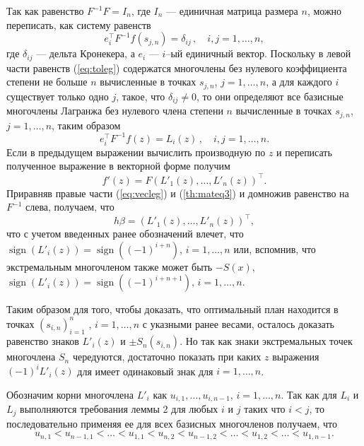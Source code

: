 \documentclass[specialist,
               substylefile = spbu.rtx,
               subf,href,colorlinks=true, 12pt]{disser}
\theoremstyle{definition}
\DeclareMathOperator*{\sign}{sign}
\begin{document}
	Так как равенство $F^{-1}F = I_n$, где $I_n$ --- единичная матрица размера $n$, можно переписать, как систему равенств
	\begin{equation}
		\label{eq:toleg}
		e_i^{\top} F^{-1} f(s_{j,n}) = \delta_{ij} \, , \quad i, j = 1, \ldots , n ,
	\end{equation}
	где $\delta_{ij}$ --- дельта Кронекера, а $e_i$ --- $i$--ый единичный вектор. Поскольку в левой части равенств (\ref{eq:toleg}) содержатся многочлены без нулевого коэффициента степени не больше $n$ вычисленные в точках $s_{j, n}$, $j=1, \ldots , n$, а для каждого $i$ существует только одно $j$, такое, что $\delta_{ij} \neq 0$, то они определяют все базисные многочлены Лагранжа без нулевого члена степени $n$ вычисленные в точках $s_{j, n}$, $j=1, \ldots , n$, таким образом
	\begin{equation}
		\label{eq:leg}
		e_i^{\top} F^{-1} f(z) = L_i(z) \, , \quad i, j = 1, \ldots , n .
	\end{equation}
	Если в предыдущем выражении вычислить производную по $z$ и переписать полученное выражение в векторной форме получим
	\begin{equation}
		\label{eq:vecleg}
		f'(z) = F \left( L'_1(z), \ldots, L'_n(z) \right)^\top.
	\end{equation}
	Приравняв правые части (\ref{eq:vecleg}) и (\ref{th:mateq3}) и домножив равенство на $F^{-1}$ слева, получаем, что
	\begin{equation}
		\label{eq:vecleg}
		h \beta = \left( L'_1(z), \ldots, L'_n(z) \right)^\top,
	\end{equation}
	что с учетом введенных ранее обозначений влечет, что $\sign (L'_i(z)) = \sign((-1)^{i+n}) $, $i = 1, \ldots, n$ или, вспомнив, что экстремальным многочленом также может быть $-S(x)$,  $\sign (L'_i(z)) = \sign((-1)^{i+n+1}) $, $i = 1, \ldots, n$.
	
	Таким образом для того, чтобы доказать, что оптимальный план находится в точках $(s_{i, n})_{i=1}^n$ , $i = 1, \ldots, n$ с указными ранее весами, осталось доказать равенство знаков $L'_i(z)$ и $\pm S_n(s_{i, n})$. Но так как знаки экстремальных точек многочлена $S_n$ чередуются, достаточно показать при каких $z$ выражения $(-1)^i L'_i(z)$ для имеет одинаковый знак для $i=1,\ldots , n$.
	
	Обозначим корни многочлена $L'_i$ как $u_{i,1}, \ldots, u_{i,n-1}$, $i = 1, \ldots, n$. Так как для $L_i$ и $L_j$ выполняются требования леммы 2 для любых $i$ и $j$ таких что $i < j$, то последовательно применяя ее для всех базисных многочленов получаем, что
	\begin{equation}
	\label{eq:droots}
		u_{n, 1} < u_{n-1, 1} < \ldots < u_{1, 1} < u_{n, 2} < u_{n-1, 2} < \ldots < u_{1, 2} < \ldots < u_{1, n-1}.
	\end{equation}
	
\end{document}
